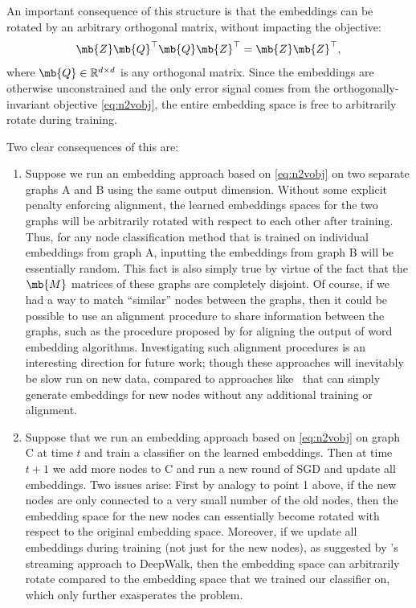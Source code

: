 An important consequence of this structure is that the embeddings can be rotated by an arbitrary orthogonal matrix, without impacting the objective:
\begin{equation}
\mb{Z}\mb{Q}^\top\mb{Q}\mb{Z}^\top = \mb{Z}\mb{Z}^\top,
\end{equation}
where $\mb{Q} \in \mathbb{R}^{d\times d}$ is any orthogonal matrix. 
Since the embeddings are otherwise unconstrained and the only error signal comes from the orthogonally-invariant objective \eqref{eq:n2vobj}, the entire embedding space is free to arbitrarily rotate during training.  

Two clear consequences of this are:
\begin{enumerate}
\item
	Suppose we run an embedding approach based on \eqref{eq:n2vobj} on two separate graphs A and B using the same output dimension. Without some explicit penalty enforcing alignment, the learned embeddings spaces for the two graphs will be arbitrarily rotated with respect to each other after training. 
	Thus, for any node classification method that is trained on individual embeddings from graph A, inputting the embeddings from graph B will be essentially random. 
	This fact is also simply true by virtue of the fact that the $\mb{M}$ matrices of these graphs are completely disjoint. 
	Of course, if we had a way to match ``similar'' nodes between the graphs, then it could be possible to use an alignment procedure to share information between the graphs, such as the procedure proposed by \cite{hamilton2016diachronic} for aligning the output of word embedding algorithms. 
	Investigating such alignment procedures is an interesting direction for future work; though these approaches will inevitably be slow run on new data, compared to approaches like \name\ that can simply generate embeddings for new nodes without any additional training or alignment. 
\item
  Suppose that we run an embedding approach based on \eqref{eq:n2vobj} on graph C at time $t$ and train a classifier on the learned embeddings. Then at time $t+1$ we add more nodes to C and run a new round of SGD and update all embeddings.
  Two issues arise: First by analogy to point 1 above, if the new nodes are only connected to a very small number of the old nodes, then the embedding space for the new nodes can essentially become rotated with respect to the original embedding space.
  Moreover, if we update all embeddings during training (not just for the new nodes), as suggested by \cite{perozzi2014deepwalk}'s streaming approach to DeepWalk, then the embedding space can arbitrarily rotate compared to the embedding space that we trained our classifier on, which only further exasperates the problem.  
\end{enumerate}

